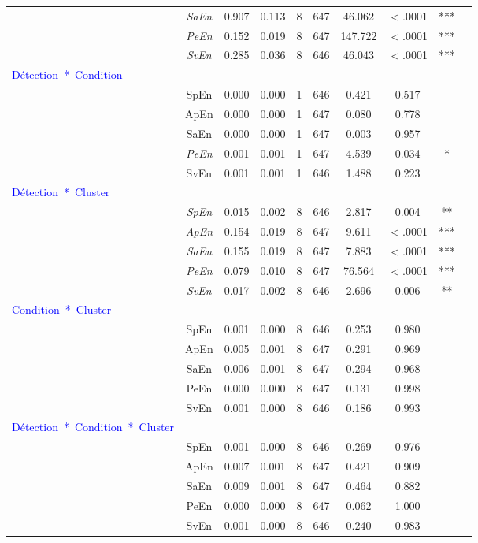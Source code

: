\begin{table}[!t]
\begin{tabular}{|l|*{9}{c|}}
& \textit{SaEn} & 0.907 & 0.113 & 8 & 647 & 46.062 & $<$.0001 & *** \\ 
& \textit{PeEn} & 0.152 & 0.019 & 8 & 647 & 147.722 & $<$.0001 & ***\\ 
& \textit{SvEn} & 0.285 & 0.036 & 8 & 646 & 46.043 & $<$.0001 & *** \\ 
\hline
\textcolor{blue}{Détection~*~Condition} & & & & & & & & \\ 
\hline
& SpEn & 0.000 & 0.000 & 1 & 646 & 0.421 & 0.517 & \\ 
& ApEn & 0.000 & 0.000 & 1 & 647 & 0.080 & 0.778 & \\ 
& SaEn & 0.000 & 0.000 & 1 & 647 & 0.003 & 0.957 & \\ 
& \textit{PeEn} & 0.001 & 0.001 & 1 & 647 & 4.539 & 0.034 & * \\ 
& SvEn & 0.001 & 0.001 & 1 & 646 & 1.488 & 0.223 & \\ 
\hline
\textcolor{blue}{Détection~*~Cluster} & & & & & & & & \\ 
\hline
& \textit{SpEn} & 0.015 & 0.002 & 8 & 646 & 2.817 & 0.004 & ** \\ 
& \textit{ApEn} & 0.154 & 0.019 & 8 & 647 & 9.611 & $<$.0001 & *** \\ 
& \textit{SaEn} & 0.155 & 0.019 & 8 & 647 & 7.883 & $<$.0001 & *** \\ 
& \textit{PeEn} & 0.079 & 0.010 & 8 & 647 & 76.564 & $<$.0001 & *** \\ 
& \textit{SvEn} & 0.017 & 0.002 & 8 & 646 & 2.696 & 0.006 & ** \\ 
\hline
\textcolor{blue}{Condition~*~Cluster} & & & & & & & & \\ 
\hline
& SpEn & 0.001 & 0.000 & 8 & 646 & 0.253 & 0.980 & \\ 
& ApEn & 0.005 & 0.001 & 8 & 647 & 0.291 & 0.969 & \\ 
& SaEn & 0.006 & 0.001 & 8 & 647 & 0.294 & 0.968 & \\ 
& PeEn & 0.000 & 0.000 & 8 & 647 & 0.131 & 0.998 & \\ 
& SvEn & 0.001 & 0.000 & 8 & 646 & 0.186 & 0.993 & \\ 
\hline
\textcolor{blue}{Détection~*~Condition~*~Cluster} & & & & & & & & \\ 
\hline
& SpEn & 0.001 & 0.000 & 8 & 646 & 0.269 & 0.976 & \\ 
& ApEn & 0.007 & 0.001 & 8 & 647 & 0.421 & 0.909 & \\ 
& SaEn & 0.009 & 0.001 & 8 & 647 & 0.464 & 0.882 & \\ 
& PeEn & 0.000 & 0.000 & 8 & 647 & 0.062 & 1.000 & \\ 
& SvEn & 0.001 & 0.000 & 8 & 646 & 0.240 & 0.983 & \\ 
\hline
\end{tabular}
\end{table}

